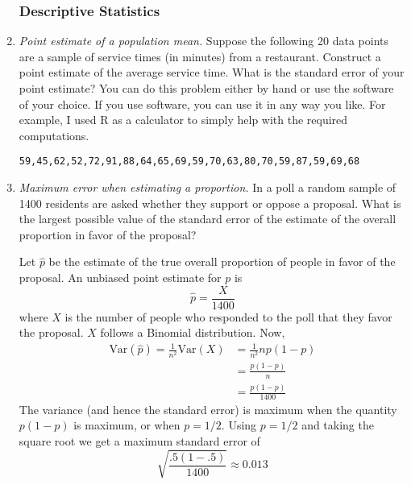 \begin{enumerate}
\subsubsection*{Descriptive Statistics}

\item \emph{Point estimate of a population mean.} Suppose the
  following 20 data points are a sample of service times (in minutes)
  from a restaurant. Construct a point estimate of the average service
  time. What is the standard error of your point estimate? You can do
  this problem either by hand or use the software of your choice. If
  you use software, you can use it in any way you like. For example, I
  used R as a calculator to simply help with the required
  computations.
\begin{verbatim}
59,45,62,52,72,91,88,64,65,69,59,70,63,80,70,59,87,59,69,68
\end{verbatim}
  
\item \emph{Maximum error when estimating a proportion.} In a poll a
  random sample of \num{1400} residents are asked whether they support
  or oppose a proposal. What is the largest possible value of the
  standard error of the estimate of the overall proportion in favor of
  the proposal?

\begin{solution}
  \bs Let $\hat{p}$ be the estimate of the true overall proportion of
  people in favor of the proposal. An unbiased point estimate for $p$
  is
\[ \hat{p} = \frac{X}{1400} \]
where $X$ is the number of people who responded to the poll that they
favor the proposal. $X$ follows a Binomial distribution. Now,
\begin{align*}
  \text{Var}(\hat{p}) = \frac{1}{n^2}\text{Var}(X) &= \frac{1}{n^2}np(1-p) \\
                                                   &= \frac{p(1-p)}{n} \\
                                                   &= \frac{p(1-p)}{1400}
\end{align*}
The variance (and hence the standard error) is maximum when the
quantity $p(1-p)$ is maximum, or when $p=1/2$. Using $p=1/2$ and
taking the square root we get a maximum standard error of
\[ \sqrt{\frac{.5(1-.5)}{1400}} \approx 0.013 \]

\end{solution}


\end{enumerate}
